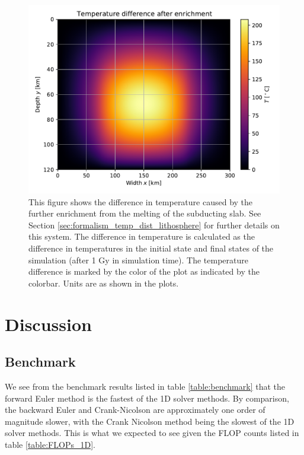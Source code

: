 \documentclass[reprint,english,notitlepage]{revtex4-1}  %
\begin{document}
\begin{figure}[H]
\centering
\includegraphics[width=\columnwidth]{../data/2D_heat_temp_diff.pdf}
\caption{This figure shows the difference in temperature caused by the further enrichment from the melting of the subducting slab. See Section \ref{sec:formalism_temp_dist_lithosphere} for further details on this system. The difference in temperature is calculated as the difference in temperatures in the initial state and final states of the simulation (after 1 Gy in simulation time). The temperature difference is marked by the color of the plot as indicated by the colorbar. Units are as shown in the plots.} \label{fig:lithosphere_temp_diff}
\end{figure}


\clearpage

\section{Discussion} \label{sec:discussion}

\subsection{Benchmark} \label{sec:discussion_benchmark}
We see from the benchmark results listed in table \ref{table:benchmark} that the forward Euler method is the fastest of the 1D solver methods. By comparison, the backward Euler and Crank-Nicolson are approximately one order of magnitude slower, with the Crank Nicolson method being the slowest of the 1D solver methods. This is what we expected to see given the FLOP counts listed in table \ref{table:FLOPs_1D}.
\end{document}
